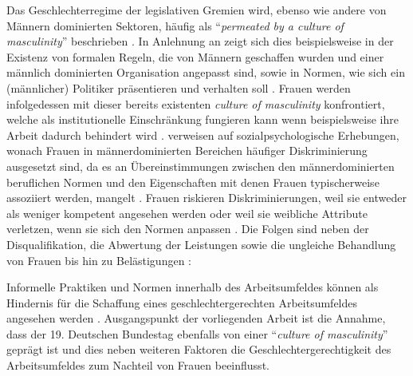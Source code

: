 \documentclass[12pt, 
    twoside=false, 
    bibliography=totoc, 
    numbers=endperiod, 
    headings=normal, 
    toc=chapterentrydotfill
    ]{scrbook}
\begin{document}
%
Das Geschlechterregime der legislativen Gremien wird, ebenso wie andere von Männern dominierten Sektoren, häufig als \enquote{\emph{permeated by a culture of masculinity}} beschrieben \parencites[200]{erikson_2018}{lovenduski_2005}.
In Anlehnung an \textcite{acker_1990} zeigt sich dies beispielsweise in der Existenz von formalen Regeln, die von Männern geschaffen wurden und einer männlich dominierten Organisation angepasst sind, sowie in Normen, wie sich ein (männlicher) Politiker präsentieren und verhalten soll \parencites[200]{erikson_2018}[48]{acker_1990}. Frauen werden infolgedessen mit dieser bereits existenten \emph{culture of masculinity} konfrontiert, welche als institutionelle Einschränkung fungieren kann wenn beispielsweise ihre Arbeit dadurch behindert wird \parencites[200]{erikson_2018}[47-56]{lovenduski_2005}. \textcite{erikson_2018} verweisen auf sozialpsychologische Erhebungen, wonach Frauen in männerdominierten Bereichen häufiger Diskriminierung ausgesetzt sind, da es an Übereinstimmungen zwischen den männerdominierten beruflichen Normen und den Eigenschaften mit denen Frauen typischerweise assoziiert werden, mangelt \parencites[vgl.][]{burgess_1999}{eagly_2002}{heilman_2001}{heilman_2004}. 
%
Frauen riskieren Diskriminierungen, weil sie entweder als weniger kompetent angesehen werden oder weil sie weibliche Attribute verletzen, wenn sie sich den Normen anpassen \parencite[200]{erikson_2018}. Die Folgen sind neben der Disqualifikation, die Abwertung der Leistungen sowie die ungleiche Behandlung von Frauen bis hin zu Belästigungen \parencites[200]{erikson_2018}{heilman_2001}{burgess_1999}:
%

\citereset
\begin{quote}
      \parencite[200]{erikson_2018}
\end{quote}

Informelle Praktiken und Normen innerhalb des Arbeitsumfeldes können als Hindernis für die Schaffung eines geschlechtergerechten Arbeitsumfeldes angesehen werden \parencite[200]{erikson_2018}. Ausgangspunkt der vorliegenden Arbeit ist die Annahme, dass der 19. Deutschen Bundestag ebenfalls von einer \enquote{\emph{culture of masculinity}} geprägt ist und dies neben weiteren Faktoren die Geschlechtergerechtigkeit des Arbeitsumfeldes zum Nachteil von Frauen beeinflusst.
\end{document}
